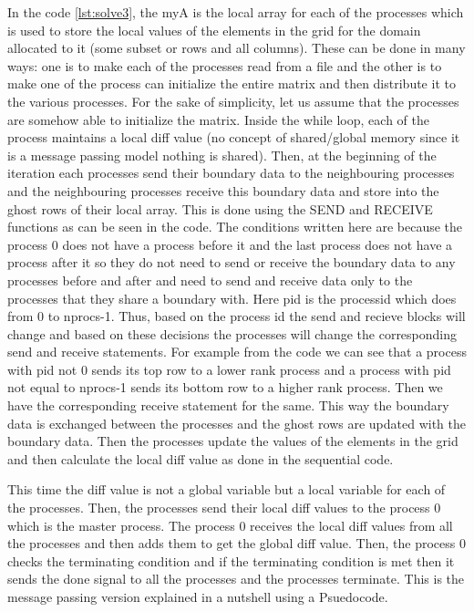 \documentclass[12pt]{book}
\begin{document}
In the code \ref{lst:solve3}, the myA is the local array for each of the processes which is used to store the local values of the elements in the grid
for the domain allocated to it (some subset or rows and all columns). These can be done in many ways: one is to make each of the processes read from a file
and the other is to make one of the process can initialize the entire matrix and then distribute it to the various processes.
For the sake of simplicity, let us assume that the processes are somehow able to initialize the matrix.
Inside the while loop, each of the process maintains a local diff value (no concept of shared/global memory since it is a message passing model nothing is shared).
Then, at the beginning of the iteration each processes send their boundary data to the neighbouring processes and the neighbouring processes receive 
this boundary data and store into the ghost rows of their local array. This is done using the SEND and RECEIVE functions as can be seen in the code.
The conditions written here are because the process 0 does not have a process before it and the last process does not have a process after it so 
they do not need to send or receive the boundary data to any processes before and after and need to send and receive data only to the processes that they share a boundary with. 
Here pid is the processid which does from 0 to nprocs-1. Thus, based on the process id the send and recieve blocks will change and 
based on these decisions the processes will change the corresponding send and receive statements. For example from the code we can see that a process with pid not 0 sends 
its top row to a lower rank process and a process with pid not equal to nprocs-1 sends its bottom row to a higher rank process. Then we have the corresponding receive statement for
the same. This way the boundary data is exchanged between the processes and the ghost rows are updated with the boundary data.
Then the processes update the values of the elements in the grid and then calculate the local diff value as done in the sequential code.

This time the diff value is not a global variable but a local variable for each of the processes. 
Then, the processes send their local diff values to the process 0 which is the master process. The process 0 receives the local diff values from all the processes and then adds them to get the global diff value.
Then, the process 0 checks the terminating condition and if the terminating condition is met then it sends the done signal to all the processes and the processes terminate.
This is the message passing version explained in a nutshell using a Psuedocode.
\end{document}
